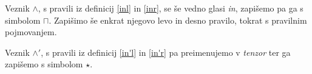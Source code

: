 \begin{definicija} \label{in}
    Veznik $\land$, s pravili iz definicij \ref{inl} in \ref{inr}, se še vedno glasi \emph{in}, zapišemo pa ga s simbolom $\sqcap$. Zapišimo še enkrat njegovo levo in desno pravilo, tokrat s pravilnim pojmovanjem.
    \begin{center}
        \begin{bprooftree}
        \end{bprooftree}
        \begin{bprooftree}
        \end{bprooftree}
        \begin{bprooftree}
        \end{bprooftree}
    \end{center}
\end{definicija}

\begin{definicija} \label{tenzor}
    Veznik $\land'$, s pravili iz definicij \ref{in'l} in \ref{in'r} pa preimenujemo v \emph{tenzor} ter ga zapišemo s simbolom $\star$.
    \begin{center}
        \begin{bprooftree}
        \end{bprooftree}
        \begin{bprooftree}
        \end{bprooftree}
    \end{center}
\end{definicija}

